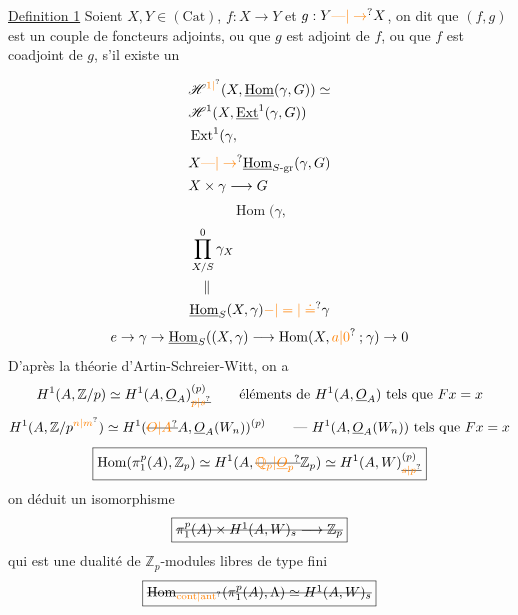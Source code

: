 \uline{Definition 1} Soient $X,Y\in(\mathrm{Cat})$, $f:X\to Y$ et $g:Y\unsure{\text{---}|\to}X$, on dit que $(f,g)$ est un couple de foncteurs adjoints, ou que $g$ est adjoint de $f$, ou que $f$ est coadjoint de $g$, s'il existe un


\[
\begin{aligned}
&\mathscr H^{\unsure{1|{}}}(X,\underline{\operatorname{Hom}}(\gamma,G))\simeq\\
&\mathscr H^1(X,\underline{\operatorname{Ext}}^1(\gamma,G))\\
&\operatorname{Ext}^1(\gamma,
\end{aligned}
\]
\[
\begin{aligned}
&X\unsure{\text{---}|\to}\underline{\operatorname{Hom}}_{S\text{-gr}}(\gamma,G)\\
&X\times\gamma\longrightarrow G
\end{aligned}
\]
\[
\operatorname{Hom}(\gamma,
\]
\[
\begin{aligned}
&\prod_{X/S}^{0}\gamma_X\\
&\quad\Vert\\
&\underline{\operatorname{Hom}}_S(X,\gamma)\unsure{-|=|\doteq}\gamma
\end{aligned}
\]
\[
e\to\gamma\to\underline{\operatorname{Hom}}_S((X,\gamma)\longrightarrow
\operatorname{Hom}(X,\unsure{a|0}\mathbin{;}\gamma)\to0
\]
D'après la théorie d'Artin-Schreier-Witt, on a
\[
H^1(A,\mathbb Z/p)\simeq H^1(A,\underline O_A)_{\deleted{\unsure{p|s}}}^{(p)}
\qquad \text{éléments de } H^1(A,\underline O_A)\text{ tels que } Fx=x
\]
\[
H^1(A,\mathbb Z/p^{\unsure{n|m}})\simeq
H^1(\deleted{\unsure{O|A}}A,\underline O_A(W_n))^{(p)}
\qquad \text{--- }H^1(A,\underline O_A(W_n))\text{ tels que }Fx=x
\]
\[
\boxed{\operatorname{Hom}(\pi_1^p(A),\mathbb Z_p)\simeq H^1(A,\deleted{\unsure{\mathbb Q_p|\underline O_p}}\mathbb Z_p)
\simeq H^1(A,W)_{\deleted{\unsure{s|p}}}^{(p)}}
\]
   on déduit un  isomorphisme
\[
\boxed{\deleted{\pi_1^p(A)\times H^1(A,W)_s\longrightarrow\mathbb Z_p}}
\]
qui est une dualité  de $\mathbb Z_p$-modules libres de type fini
\[
\boxed{\deleted{\operatorname{Hom}_{\unsure{\mathrm{cont}|\mathrm{ant}}}(\pi_1^p(A),\Lambda)\simeq H^1(A,W)_s}}
\]

